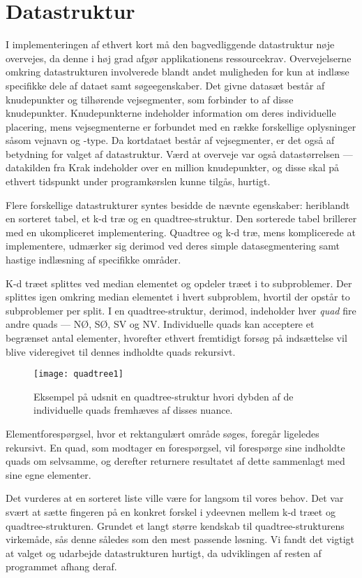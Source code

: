 \section{Datastruktur}
\label{sec:datastruktur}
I implementeringen af ethvert kort må den bagvedliggende datastruktur nøje overvejes, da denne i høj grad afgør applikationens ressourcekrav. Overvejelserne omkring datastrukturen involverede blandt andet muligheden for kun at indlæse specifikke dele af dataet samt søgeegenskaber. Det givne datasæt består af knudepunkter og tilhørende vejsegmenter, som forbinder to af disse knudepunkter. Knudepunkterne indeholder information om deres individuelle placering, mens vejsegmenterne er forbundet med en række forskellige oplysninger såsom vejnavn og -type. Da kortdataet består af vejsegmenter, er det også af betydning for valget af datastruktur. Værd at overveje var også datastørrelsen --- datakilden fra Krak indeholder over en million knudepunkter, og disse skal på ethvert tidspunkt under programkørslen kunne tilgås, hurtigt.

Flere forskellige datastrukturer syntes besidde de nævnte egenskaber: heriblandt en sorteret tabel, et k-d træ og en quadtree-struktur. Den sorterede tabel brillerer med en ukompliceret implementering. Quadtree og k-d træ, mens komplicerede at implementere, udmærker sig derimod ved deres simple datasegmentering samt hastige indlæsning af specifikke områder.

K-d træet splittes ved median elementet og opdeler træet i to subproblemer. Der splittes igen omkring median elementet i hvert subproblem, hvortil der opstår to subproblemer per split. I en quadtree-struktur, derimod, indeholder hver \emph{quad} fire andre quads --- NØ, SØ, SV og NV. Individuelle quads kan acceptere et begrænset antal elementer, hvorefter ethvert fremtidigt forsøg på indsættelse vil blive videregivet til dennes indholdte quads rekursivt.
\begin{figure}[ht]
	\centering
	\texttt{[image: quadtree1]}
	\captionsetup{width=0.8\textwidth}
	\caption{Eksempel på udsnit en quadtree-struktur hvori dybden af de individuelle quads fremhæves af disses nuance.}
	\label{fig:quadtree1}
\end{figure}
Elementforespørgsel, hvor et rektangulært område søges, foregår ligeledes rekursivt. En quad, som modtager en forespørgsel, vil forespørge sine indholdte quads om selvsamme, og derefter returnere resultatet af dette sammenlagt med sine egne elementer.

Det vurderes at en sorteret liste ville være for langsom til vores behov. Det var svært at sætte fingeren på en konkret forskel i ydeevnen mellem k-d træet og quadtree-strukturen. Grundet et langt større kendskab til quadtree-strukturens virkemåde, sås denne således som den mest passende løsning. Vi fandt det vigtigt at valget og udarbejde datastrukturen hurtigt, da udviklingen af resten af programmet afhang deraf.

